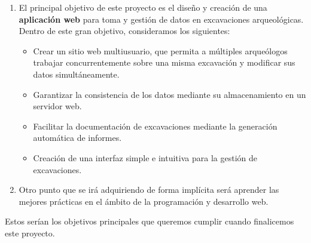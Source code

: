    \begin{enumerate}
        \item El principal objetivo de este proyecto es el diseño y creación de una
        \textbf{aplicación web} para toma y gestión de datos en excavaciones arqueológicas.
        Dentro de este gran objetivo, consideramos los siguientes:
            \begin{itemize}
                \item Crear un sitio web multiusuario, que permita a múltiples arqueólogos
                trabajar concurrentemente sobre una misma excavación y modificar sus datos
                simultáneamente.
                \item Garantizar la consistencia de los datos mediante su almacenamiento en
                un servidor web.
                \item Facilitar la documentación de excavaciones mediante la generación
                automática de informes.
                \item Creación de una interfaz simple e intuitiva para la gestión de
                excavaciones.
            \end{itemize}
            \item Otro punto que se irá adquiriendo de forma implícita será aprender las
            mejores prácticas en el ámbito de la programación y desarrollo web.
    \end{enumerate}

Estos serían los objetivos principales que queremos cumplir cuando finalicemos este proyecto. 
